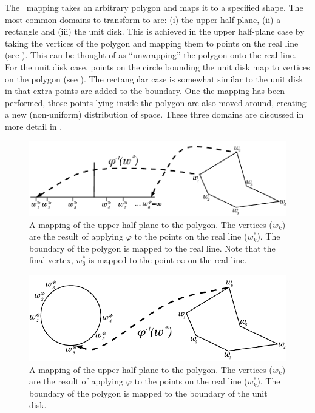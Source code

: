 The \sch\ mapping takes an arbitrary polygon and maps it to a specified shape. The most common domains to transform to are: (i) the upper half-plane, (ii) a rectangle and (iii) the unit disk. This is achieved in the upper half-plane case by taking the vertices of the polygon and mapping them to points on the real line (see ). This can be thought of as ``unwrapping'' the polygon onto the real line. For the unit disk case, points on the circle bounding the unit disk map to vertices on the polygon (see ). The rectangular case is somewhat similar to the unit disk in that extra points are added to the boundary. One the mapping has been performed, those points lying inside the polygon are also moved around, creating a new (non-uniform) distribution of space. These three domains are discussed in more detail in .

\begin{figure} [t]
\centering
\includegraphics[scale=0.6]{sc/figs/reallinedia.pdf}
\caption{A mapping of the upper half-plane to the polygon. The vertices ($w_k$) are the result of applying $\varphi$ to the points on the real line ($w^*_k$). The boundary of the polygon is mapped to the real line. Note that the final vertex, $w^*_6$ is mapped to the point $\infty$ on the real line.}
\label{reallinedia}
\end{figure}

\begin{figure} [t]
\centering
\includegraphics[scale=0.6]{sc/figs/unitdiskdia.pdf}
\caption{A mapping of the upper half-plane to the polygon. The vertices ($w_k$) are the result of applying $\varphi$ to the points on the real line ($w^*_k$). The boundary of the polygon is mapped to the boundary of the unit disk.}
\label{unitdiskdia}
\end{figure}


